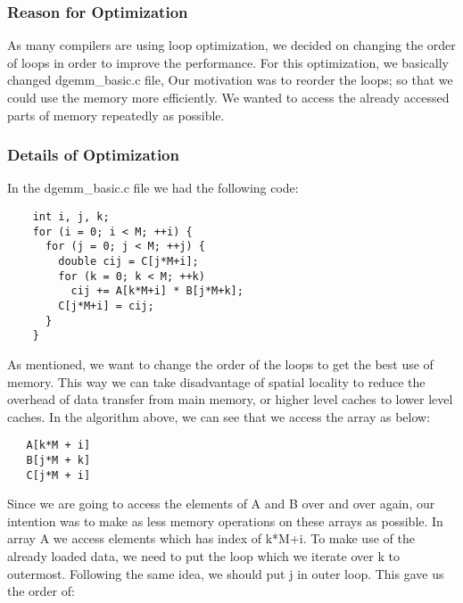 
\subsubsection{Reason for Optimization}

As many compilers are using loop optimization, we decided on changing the
order of loops in order to improve the performance. For this
optimization, we basically changed dgemm\_basic.c file, Our motivation was
to reorder the loops; so that we could use the memory more
efficiently. We wanted to access the already accessed parts of memory
repeatedly as possible.

\subsubsection{Details of Optimization}

In the dgemm\_basic.c file we had the following code:
\smallskip

\begin{verbatim}
    int i, j, k;
    for (i = 0; i < M; ++i) {
      for (j = 0; j < M; ++j) {
        double cij = C[j*M+i];
        for (k = 0; k < M; ++k)
          cij += A[k*M+i] * B[j*M+k];
        C[j*M+i] = cij;
      }
    }
\end{verbatim}
\smallskip

As mentioned, we want to change the order of the loops to get the best
use of memory. This way we can take disadvantage of spatial locality to
reduce the overhead of data transfer from main memory, or higher level
caches to lower level caches.  In the algorithm above, we can see that we
access the array as below:
\smallskip

\begin{verbatim}
   A[k*M + i]
   B[j*M + k]
   C[j*M + i]
\end{verbatim}

Since we are going to access the elements of A and B over and over again,
our intention was to make as less memory operations on these arrays as
possible. In array A we access elements which has index of k*M+i. To make
use of the already loaded data, we need to put the loop which we iterate
over k to outermost. Following the same idea, we should put j in outer
loop. This gave us the order of:
\smallskip

